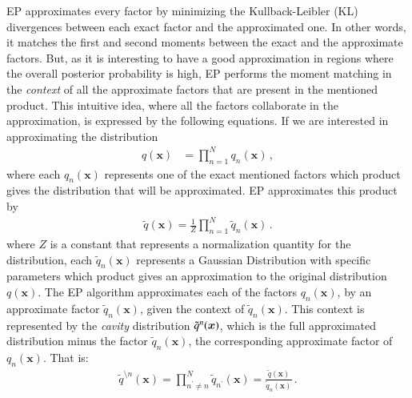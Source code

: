 \documentclass[review,preprint,12pt]{elsarticle}
\begin{document}
EP approximates every factor by minimizing the Kullback-Leibler (KL) divergences between each exact factor and the approximated one. In other words, it matches the first and second moments between the exact and the approximate factors. But, as it is interesting to have a good approximation in regions where the overall posterior probability is high, EP performs the moment matching in the \textit{context} of all the approximate factors that are present in the mentioned product. This intuitive idea, where all the factors collaborate in the approximation, is expressed by the following equations. If we are interested in approximating the distribution
\begin{align}
    q(\boldsymbol{x}) & = \prod_{n=1}^{N}q_n(\boldsymbol{x})\,,
\end{align}
where each $q_n(\boldsymbol{x})$ represents one of the exact mentioned factors which product gives the distribution that will be approximated. EP approximates this product by
\begin{align}
    \tilde{q}(\boldsymbol{x}) = \frac{1}{Z}\prod_{n=1}^{N}\tilde{q}_n(\boldsymbol{x})\,.
\end{align}
where $Z$ is a constant that represents a normalization quantity for the distribution, each $\tilde{q}_n(\boldsymbol{x})$ represents a Gaussian Distribution with specific parameters which product gives an approximation to the original distribution $q(\boldsymbol{x})$. The EP algorithm approximates each of the factors $q_n(\boldsymbol{x})$, by an approximate factor $\tilde{q}_n(\boldsymbol{x})$, given the context of $\tilde{q}_n(\boldsymbol{x})$. This context is represented by the \textit{cavity} distribution $\tilde{q}^{\\n}(\boldsymbol{x})$, which is the full approximated distribution minus the factor $\tilde{q}_n(\boldsymbol{x})$, the corresponding approximate factor of $q_n(\boldsymbol{x})$. That is:
\begin{align}
\tilde{q}^{\setminus n}(\boldsymbol{x}) = \prod_{n^{'}\neq n}^{N} \tilde{q}_{n^{'}}(\boldsymbol{x}) = \frac{\tilde{q}(\boldsymbol{x})}{\tilde{q}_n(\boldsymbol{x})}\,.
\end{align}
\end{document}
